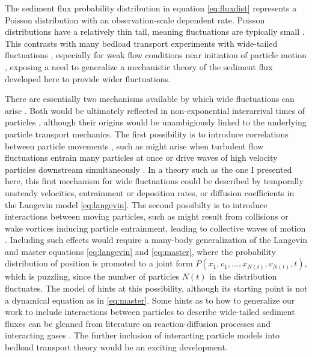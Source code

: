 The sediment flux probability distribution in equation \ref{eq:fluxdist} represents a Poisson distribution with an observation-scale dependent rate.
Poisson distributions have a relatively thin tail, meaning fluctuations are typically small \citep{Ancey2006}. This contrasts with many bedload transport experiments with wide-tailed fluctuations \citep{Ancey2008,Heyman2016,Fathel2015}, especially for weak flow conditions near initiation of particle motion \citep{Benavides2021}, exposing a need to generalize a mechanistic theory of the sediment flux developed here to provide wider fluctuations.

There are essentially two mechanisms available by which wide fluctuations can arise \citep{Goh2008}. Both would be ultimately reflected in non-exponential interarrival times of particles \citep[e.g.][]{Turowski2010,Heyman2013}, although their origins would be unambigiously linked to the underlying particle transport mechanics.
The first possibility is to introduce correlations between particle movements \citep{Ancey2008,Heyman2013,Ancey2014}, such as might arise when turbulent flow fluctuations entrain many particles at once \citep{Cameron2020} or drive waves of high velocity particles downstream simultaneously \citep{Nino1996}. 
In a theory such as the one I presented here, this first mechanism for wide fluctuations could be described by temporally unsteady velocities, entrainment or deposition rates, or diffusion coefficients in the Langevin model \ref{eq:langevin}.
The second possibilty is to introduce interactions between moving particles, such as might result from collisions \citep{Lee2018} or wake vortices \citep{Schmeeckle2014} inducing particle entrainment, leading to collective waves of motion \citep{Ancey2014}.
Including such effects would require a many-body generalization of the Langevin and master equations \ref{eq:langevin} and \ref{eq:master}, where the probability distribution of position is promoted to a joint form $P(x_1,v_1,\dots,x_{N(t)},v_{N(t)},t)$, which is puzzling, since the number of particles $N(t)$ in the distribution fluctuates.
The model of \citet{Ancey2014} hints at this possibility, although its starting point is not a dynamical equation as in \ref{eq:master}.
Some hints as to how to generalize our work to include interactions between particles to describe wide-tailed sediment fluxes can be gleaned from literature on reaction-diffusion processes \citep{Hernandez2004,Cardy2006} and interacting gases \citep{Chapman1970,Brilliantov2004}. The further inclusion of interacting particle models into bedload transport theory would be an exciting development.



